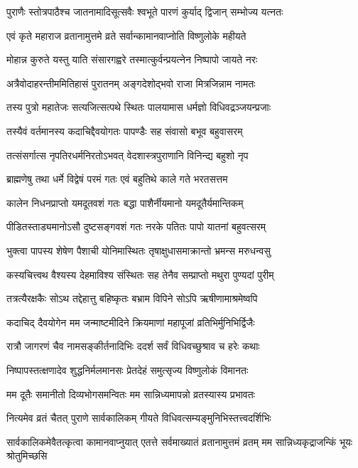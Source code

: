 \twolineshloka
{पुराणैः स्तोत्रपाठैश्च जातनामादिसूत्सवैः}
{श्वभूते पारणं कुर्याद् द्विजान् सम्भोज्य यत्नतः}%

\twolineshloka
{एवं कृते महाराज व्रतानामुत्तमे व्रते}
{सर्वान्कामानवाप्नोति विष्णुलोके महीयते}%

\twolineshloka
{मोहान्न कुरुते यस्तु याति संसारगह्वरे}
{तस्मात्कुर्वन्प्रयत्नेन निष्पापो जायते नरः}%

\twolineshloka
{अत्रैवोदाहरन्तीममितिहासं पुरातनम्}
{अङ्गदेशोद्भवो राजा मित्रजिन्नाम नामतः}%

\twolineshloka
{तस्य पुत्रो महातेजः सत्यजित्सत्पथे स्थितः}
{पालयामास धर्मज्ञो विधिवद्रञ्जयन्प्रजाः}%

\twolineshloka
{तस्यैवं वर्तमानस्य कदाचिद्दैवयोगतः}
{पापण्डैः सह संवासो बभूव बहुवासरम्}%

\twolineshloka
{तत्संसर्गात्स नृपतिरधर्मनिरतोऽभवत्}
{वेदशास्त्रपुराणानि विनिन्द्य बहुशो नृप}%

\twolineshloka
{ब्राह्मणेषु तथा धर्मे विद्वेषं परमं गतः}
{एवं बहुतिथे काले गते भरतसत्तम}%

\twolineshloka
{कालेन निधनप्राप्तो यमदूतवशं गतः}
{बद्धा पाशैर्नीयमानो यमदूतैर्यमान्तिकम्}%

\twolineshloka
{पीडितस्ताड्यमानोऽसौ दुष्टसङ्गवशं गतः}
{नरके पतितः पापो यातनां बहुवत्सरम्}%

\twolineshloka
{भुक्त्वा पापस्य शेषेण पैशाची योनिमास्थितः}
{तृषाक्षुधासमाक्रान्तो भ्रमन्स मरुधन्वसु}%

\twolineshloka
{कस्यचित्त्वथ वैश्यस्य देहमाविश्य संस्थितः}
{सह तेनैव सम्प्राप्तो मथुरा पुण्यदां पुरीम्}%

\twolineshloka
{तत्रत्यैरक्षकैः सोऽथ तद्देहात्तु बहिष्कृतः}
{बभ्राम विपिने सोऽपि ऋषीणामाश्रमेष्वपि}%

\twolineshloka
{कदाचिद् दैवयोगेन मम जन्माष्टमीदिने}
{क्रियमाणां महापूजां व्रतिभिर्मुनिभिर्द्विजैः}%

\twolineshloka
{रात्रौ जागरणं चैव नामसङ्कीर्तनादिभिः}
{ददर्श सर्वं विधिवच्छुश्राव च हरेः कथाः}%

\twolineshloka
{निष्पापस्तत्क्षणादेव शुद्धनिर्मलमानसः}
{प्रेतदेहं समुत्सृज्य विष्णुलोकं विमानतः}%

\twolineshloka
{मम दूतैः समानीतो दिव्यभोगसमन्वितः}
{मम सान्निध्यमापन्नो व्रतस्यास्य प्रभावतः}%

\twolineshloka
{नित्यमेव व्रतं चैतत् पुराणे सार्वकालिकम्}
{गीयते विधिवत्सम्यङ्मुनिभिस्तत्त्वदर्शिभिः}%

\threelineshloka
{सार्वकालिकमेवैतत्कृत्वा कामानवाप्नुयात्}
{एतत्ते सर्वमाख्यातं व्रतानामुत्तमं व्रतम्}
{मम सान्निध्यकृद्राजन्किं भूयः श्रोतुमिच्छसि}%

